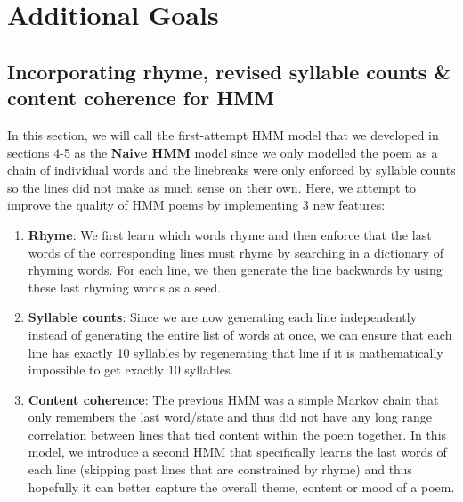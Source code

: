 

\section{Additional Goals}


\subsection*{Incorporating rhyme, revised syllable counts \& content coherence for HMM}
In this section, we will call the first-attempt HMM model that we developed in sections 4-5 as the \textbf{Naive HMM}  model since we only modelled the poem as a chain of individual words and the linebreaks were only enforced by syllable counts so the lines did not make as much sense on their own. Here, we attempt to improve the quality of HMM poems by implementing 3 new features:
\begin{enumerate}
    \item \textbf{Rhyme}: We first learn which words rhyme and then enforce that the last words of the corresponding lines must rhyme by searching in a dictionary of rhyming words. For each line, we then generate the line backwards by using these last rhyming words as a seed.
    \item \textbf{Syllable counts}: Since we are now generating each line independently instead of generating the entire list of words at once, we can ensure that each line has exactly 10 syllables by regenerating that line if it is mathematically impossible to get exactly 10 syllables.
    \item \textbf{Content coherence}: The previous HMM was a simple Markov chain that only remembers the last word/state and thus did not have any long range correlation between lines that tied content within the poem together. In this model, we introduce a second HMM that specifically learns the last words of each line (skipping past lines that are constrained by rhyme) and thus hopefully it can better capture the overall theme, content or mood of a poem.
\end{enumerate}
